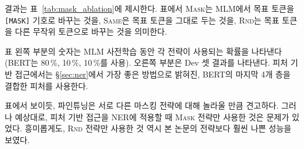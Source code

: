결과는 표~\ref{tab:mask_ablation}에 제시한다. 표에서 \textsc{Mask}는 MLM에서 목표 토큰을 {\tt [MASK]} 기호로 바꾸는 것을, \textsc{Same}은 목표 토큰을 그대로 두는 것을, \textsc{Rnd}는 목표 토큰을 다른 무작위 토큰으로 바꾸는 것을 의미한다.

표 왼쪽 부분의 숫자는 MLM 사전학습 동안 각 전략이 사용되는 확률을 나타낸다(BERT는 80\,\%, 10\,\%, 10\,\%를 사용). 오른쪽 부분은 Dev 셋 결과를 나타낸다. 피처 기반 접근에서는 \S\ref{sec:ner}에서 가장 좋은 방법으로 밝혀진, BERT의 마지막 4개 층을 결합한 피처를 사용한다.

표에서 보이듯, 파인튜닝은 서로 다른 마스킹 전략에 대해 놀라울 만큼 견고하다. 그러나 예상대로, 피처 기반 접근을 NER에 적용할 때 \textsc{Mask} 전략만 사용한 것은 문제가 있었다. 흥미롭게도, \textsc{Rnd} 전략만 사용한 것 역시 본 논문의 전략보다 훨씬 나쁜 성능을 보였다.





